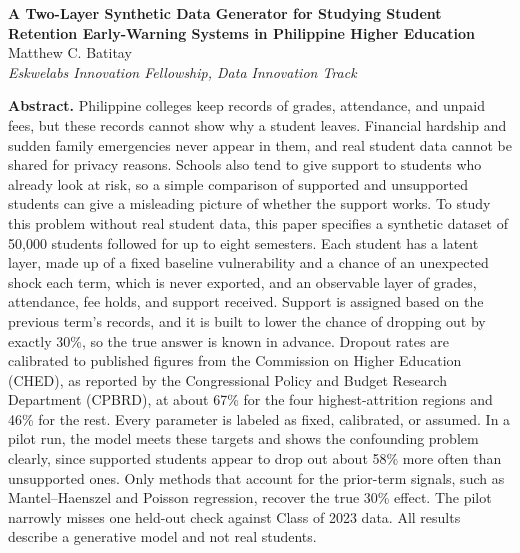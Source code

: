 \documentclass[11pt]{article}
\begin{document}
\begin{tcolorbox}[colback=titlebox,colframe=titlebox,arc=4mm,boxrule=0pt,left=10mm,right=10mm,top=6mm,bottom=6mm]
\begin{center}
{\sffamily\bfseries\LARGE A Two-Layer Synthetic Data Generator for Studying Student Retention Early-Warning Systems in Philippine Higher Education}\\[10pt]
{\large Matthew C. Batitay}\\[2pt]
{\itshape Eskwelabs Innovation Fellowship, Data Innovation Track}
\end{center}
\vspace{6pt}

\noindent\textbf{Abstract.} Philippine colleges keep records of grades, attendance, and unpaid fees, but these records cannot show why a student leaves. Financial hardship and sudden family emergencies never appear in them, and real student data cannot be shared for privacy reasons. Schools also tend to give support to students who already look at risk, so a simple comparison of supported and unsupported students can give a misleading picture of whether the support works. To study this problem without real student data, this paper specifies a synthetic dataset of 50{,}000 students followed for up to eight semesters. Each student has a latent layer, made up of a fixed baseline vulnerability and a chance of an unexpected shock each term, which is never exported, and an observable layer of grades, attendance, fee holds, and support received. Support is assigned based on the previous term's records, and it is built to lower the chance of dropping out by exactly 30\%, so the true answer is known in advance. Dropout rates are calibrated to published figures from the Commission on Higher Education (CHED), as reported by the Congressional Policy and Budget Research Department (CPBRD), at about 67\% for the four highest-attrition regions and 46\% for the rest. Every parameter is labeled as fixed, calibrated, or assumed. In a pilot run, the model meets these targets and shows the confounding problem clearly, since supported students appear to drop out about 58\% more often than unsupported ones. Only methods that account for the prior-term signals, such as Mantel--Haenszel and Poisson regression, recover the true 30\% effect. The pilot narrowly misses one held-out check against Class of 2023 data. All results describe a generative model and not real students.
\end{tcolorbox}

\vspace{10pt}
\end{document}
